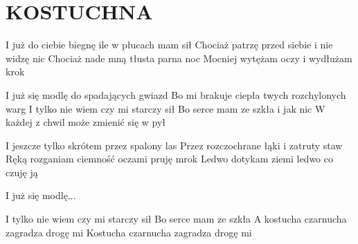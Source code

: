 \documentclass[../../../songbook.tex]{subfiles}
\begin{document}
\TabPositions{9cm} %
\section*{KOSTUCHNA}
{}
\vspace{0.5cm}
I już do ciebie biegnę ile w płucach mam sił	 \newline
Chociaż patrzę przed siebie i nie widzę nic		 \newline
Chociaż nade mną tłusta parna noc				 \newline
Mocniej wytężam oczy i wydłużam krok			 \newline

\-\hspace{1cm} I już się modlę do spadających gwiazd		  \newline
\-\hspace{1cm} Bo mi brakuje ciepła twych rozchylonych warg	  \newline
\-\hspace{1cm} I tylko nie wiem czy mi starczy sił			  \newline
\-\hspace{1cm} Bo serce mam ze szkła i jak nic				    \newline
\-\hspace{1cm} W każdej z chwil może zmienić się w pył		 \newline

I jeszcze tylko skrótem przez spalony las \newline
Przez rozczochrane łąki i zatruty staw \newline
Ręką rozganiam ciemność oczami pruję mrok \newline
Ledwo dotykam ziemi ledwo co czuję ją \newline

\-\hspace{1cm} I już się modlę... \newline
 
\-\hspace{1cm} I tylko nie wiem czy mi starczy sił			 \newline
\-\hspace{1cm} Bo serce mam ze szkła 						 \newline
\-\hspace{1cm} A kostucha czarnucha zagradza drogę mi		 \newline
\-\hspace{1cm} Kostucha czarnucha zagradza drogę mi			 \newline
\end{document}

